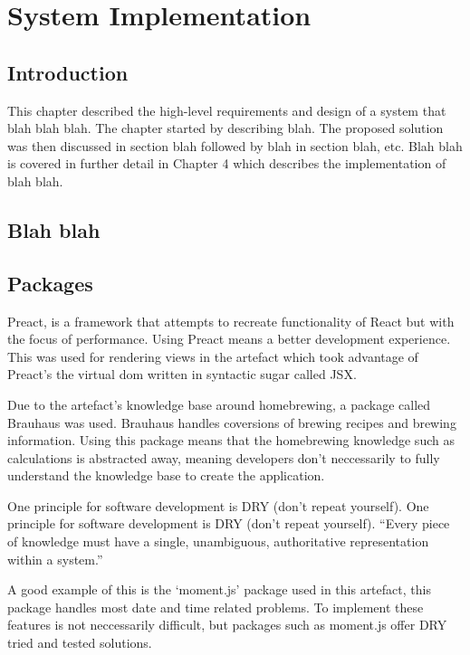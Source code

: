 \chapter{System Implementation}

\section{Introduction} \label{s-i--introduction}

This chapter described the high-level requirements and design of a system that blah blah blah.  The chapter started by describing blah.  The proposed solution was then discussed in section blah followed by blah in section blah, etc.
Blah blah is covered in further detail in Chapter 4 which describes the implementation of blah blah.

\section{Blah blah}


\section{Packages}

Preact, is a framework that attempts to recreate functionality of React but with the focus of performance. Using Preact means a better development experience. \cite{preact} This was used for rendering views in the artefact which took advantage of Preact's the virtual dom written in syntactic sugar called JSX.

Due to the artefact's knowledge base around homebrewing, a package called Brauhaus was used. Brauhaus handles coversions of brewing recipes and brewing information. Using this package means that the homebrewing knowledge such as calculations is abstracted away, meaning developers don't neccessarily to fully understand the knowledge base to create the application. \cite{brauhaus.js}

One principle for software development is DRY (don't repeat yourself). One principle for software development is DRY (don't repeat yourself). ``Every piece of knowledge must have a single, unambiguous, authoritative representation within a system.'' \cite{DRY}

A good example of this is the `moment.js' package used in this artefact, this package handles most date and time related problems. To implement these features is not neccessarily difficult, but packages such as moment.js offer DRY tried and tested solutions. \cite{moment.js}

